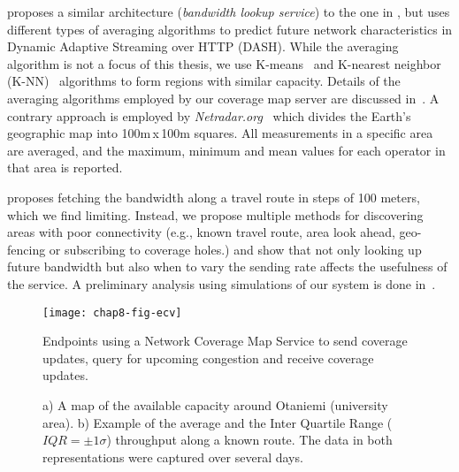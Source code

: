 \cite{6012045} proposes a similar architecture (\emph{bandwidth lookup
service}) to the one in , but uses different types of
averaging algorithms to predict future network characteristics in Dynamic
Adaptive Streaming over HTTP (DASH). While the averaging algorithm is not a
focus of this thesis, we use K-means~\cite{Kanungo:2002:LSA:513400.513402} and
K-nearest neighbor (K-NN)~\cite{Iwerks:2003:CKN:1315451.1315496} algorithms to
form regions with similar capacity. Details of the averaging algorithms
employed by our coverage map server are discussed in~\cite{sharmistha-thesis}.
A contrary approach is employed by \emph{Netradar.org}~\cite{6576402} which
divides the Earth's geographic map into 100m\,x\,100m squares. All measurements in a
specific area are averaged, and the maximum, minimum and mean values for 
each operator in that area is reported. 

\cite{Riiser:2012:2240136} proposes fetching the bandwidth along a travel
route in steps of 100 meters, which we find limiting. Instead, we propose
multiple methods for discovering areas with poor connectivity (e.g., known
travel route, area look ahead, geo-fencing or subscribing to coverage holes.)
and show that not only looking up future bandwidth but also when to vary the
sending rate affects the usefulness of the service. A preliminary analysis
using simulations of our system is done in~\cite{Curcio:glass}.

\begin{figure}
\texttt{[image: chap8-fig-ecv]}
  \caption{Endpoints using a Network Coverage Map Service to send coverage
  updates, query for upcoming congestion and receive coverage updates.}
\label{fig:cc:ecv}
\end{figure}

\begin{figure}
  \centerline{
  }
  \centerline{
  }
  \caption{a) A map of the available capacity around Otaniemi (university
  area). b) Example of the average and the Inter Quartile Range
  ($IQR=\pm1\sigma$) throughput along a known route. The data in both
  representations were captured over several days.}
  \label{fig:glass:map}
\end{figure}


